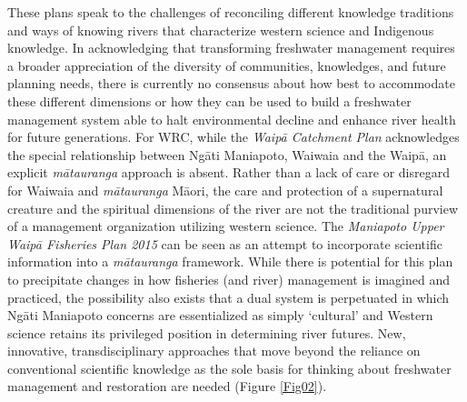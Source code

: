 \documentclass[10pt,a4paper]{article}
\begin{document}
\begin{multicols}{2}
These plans speak to the challenges of reconciling different knowledge traditions and ways of knowing rivers that characterize western science and Indigenous knowledge. In acknowledging that transforming freshwater management requires a broader appreciation of the diversity of communities, knowledges, and future planning needs, there is currently no consensus about how best to accommodate these different dimensions or how they can be used to build a freshwater management system able to halt environmental decline and enhance river health for future generations. For WRC, while the \textit{Waip\={a} Catchment Plan} acknowledges the special relationship between Ng\={a}ti Maniapoto, Waiwaia and the Waip\={a}, an explicit \textit{m\={a}tauranga} approach is absent.
Rather than a lack of care or disregard for Waiwaia and \textit{m\={a}tauranga} M\={a}ori, the care and protection
of a supernatural creature and the spiritual dimensions of the river are not the traditional purview of a management organization utilizing western science. The \textit{Maniapoto Upper Waip\={a} Fisheries Plan 2015} can be seen as an attempt to incorporate scientific information into a \textit{m\={a}tauranga} framework. While there is potential for this plan to precipitate changes in how fisheries (and river) management is imagined and practiced, the possibility also exists that a dual system is perpetuated in which Ng\={a}ti Maniapoto concerns are essentialized as simply `cultural' and Western science retains its privileged position in determining river futures. New, innovative, transdisciplinary approaches that move beyond the reliance on conventional scientific knowledge as the sole basis for thinking about freshwater management and restoration are needed (Figure \ref{Fig02}).


\vspace{\baselineskip}

\end{multicols}
\end{document}
